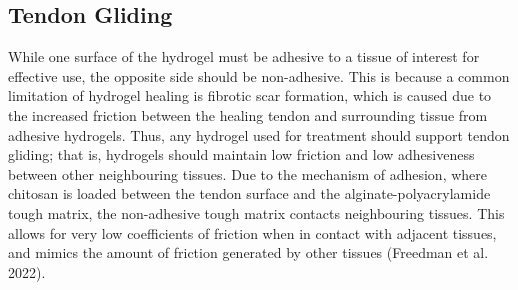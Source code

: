 \subsection{Tendon Gliding}
While one surface of the hydrogel must be adhesive to a tissue of interest for effective use, the opposite side should be non-adhesive. This is because a common limitation of hydrogel healing is fibrotic scar formation, which is caused due to the increased friction between the healing tendon and surrounding tissue from adhesive hydrogels. Thus, any hydrogel used for treatment should support tendon gliding; that is, hydrogels should maintain low friction and low adhesiveness between other neighbouring tissues. Due to the mechanism of adhesion, where chitosan is loaded between the tendon surface and the alginate-polyacrylamide tough matrix, the non-adhesive tough matrix contacts neighbouring tissues. This allows for very low coefficients of friction when in contact with adjacent tissues, and mimics the amount of friction generated by other tissues (Freedman et al. 2022).
